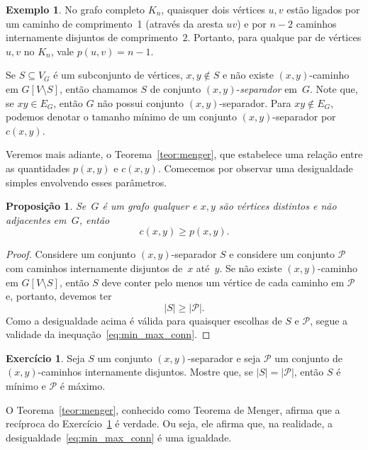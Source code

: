 \documentclass[12pt, a4paper]{article}
\newtheorem{prop}[teor]{Proposição}
\theoremstyle{definition}
\newtheorem{exem}[teor]{Exemplo}
\newtheorem{exer}{Exercício}
\begin{document}
\begin{exem}
No grafo completo $K_n$, quaisquer dois vértices $u,v$ estão ligados por um caminho de comprimento~1 (através da aresta $uv$) e por $n-2$ caminhos internamente disjuntos de comprimento~$2$. Portanto, para qualque par de vértices $u,v$ no $K_n$, vale $p(u,v) = n - 1$.
\end{exem}

Se $S \subseteq V_G$ é um subconjunto de vértices, $x,y \not\in S$ e não existe $(x,y)$-caminho em $G[V \setminus S]$, então chamamos $S$ de conjunto $(x,y)$-\emph{separador} em~$G$. Note que, se $xy \in E_G$, então $G$ não possui conjunto $(x,y)$-separador. Para $xy \not\in E_G$, podemos denotar o tamanho mínimo de um conjunto $(x,y)$-separador por $c(x,y)$. 

Veremos mais adiante, o Teorema~\ref{teor:menger}, que estabelece uma relação entre as quantidades $p(x,y)$ e $c(x,y)$. Comecemos por observar uma desigualdade simples envolvendo esses parâmetros. 

\begin{prop} 
\label{prop:easy_ineq_menger}
Se~$G$ é um grafo qualquer e $x,y$ são vértices distintos e não adjacentes em~$G$, então
  \begin{equation}
    \label{eq:min_max_conn}
     c(x,y) \geq p(x,y).
  \end{equation}
\end{prop}

\begin{proof}
Considere um conjunto $(x,y)$-separador $S$ e considere um conjunto $\mathcal{P}$ com caminhos internamente disjuntos de~$x$ até~$y$. Se não existe $(x,y)$-caminho em $G[V \setminus S]$, então $S$ deve conter pelo menos um vértice de cada caminho em $\mathcal{P}$ e, portanto, devemos ter 
\[ |S| \geq |\mathcal{P}|. \]
Como a desigualdade acima é válida para quaisquer escolhas de $S$ e $\mathcal{P}$, segue a validade da inequação~\eqref{eq:min_max_conn}.
\end{proof}

\begin{exer}
\label{exer:min_max}
Seja $S$ um conjunto $(x,y)$-separador e seja $\mathcal{P}$ um conjunto de $(x,y)$-caminhos internamente disjuntos. Mostre que, se $|S| = |\mathcal{P}|$, então $S$ é mínimo e $\mathcal{P}$ é máximo.
\end{exer}

O Teorema~\ref{teor:menger}, conhecido como Teorema de Menger, afirma que a recíproca do Exercício~\ref{exer:min_max} é verdade. Ou seja, ele afirma que, na realidade, a desigualdade~\eqref{eq:min_max_conn} é uma igualdade.
\end{document}
